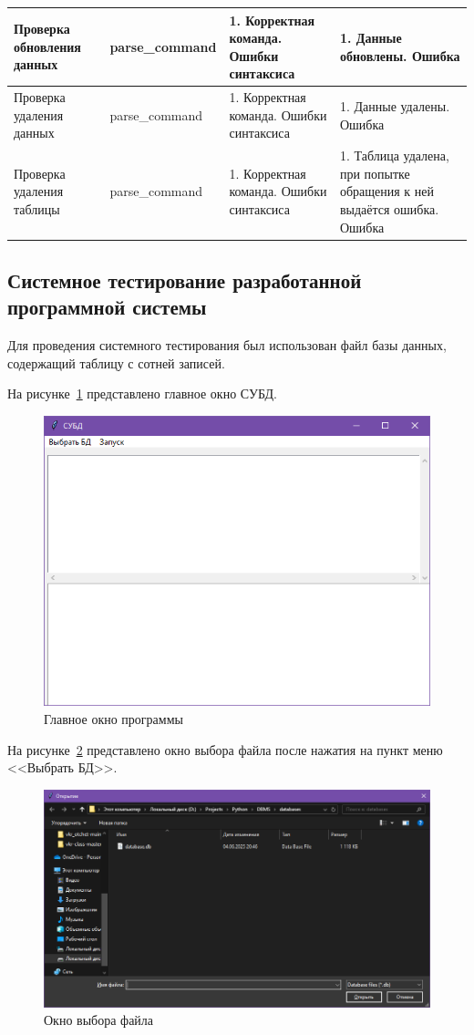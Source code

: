 \begin{xltabular}{\textwidth}{|X|X|X|X|}
	Проверка обновления данных & parse\_command & 1. Корректная команда. Ошибки синтаксиса & 1. Данные обновлены. Ошибка\\ \hline
	Проверка удаления данных & parse\_command & 1. Корректная команда. Ошибки синтаксиса & 1. Данные удалены. Ошибка\\ \hline
	Проверка удаления таблицы & parse\_command & 1. Корректная команда. Ошибки синтаксиса & 1. Таблица удалена, при попытке обращения к ней выдаётся ошибка. Ошибка\\ \hline
\end{xltabular}
\renewcommand{\arraystretch}{1.0}
\vspace{-\baselineskip}

\subsection{Системное тестирование разработанной программной системы}

Для проведения системного тестирования был использован файл базы данных, содержащий таблицу с сотней записей.

На рисунке~\ref{fig:dbms_window} представлено главное окно СУБД.
\begin{figure}[H]
	\centering
	\includegraphics[width=0.7\linewidth]{"images/окно субд"}
	\caption{Главное окно программы}
	\label{fig:dbms_window}
\end{figure}

На рисунке~\ref{fig:select} представлено окно выбора файла после нажатия на пункт меню <<Выбрать БД>>.
\begin{figure}[H]
	\centering
	\includegraphics[width=0.7\linewidth]{"images/выбор файла"}
	\caption{Окно выбора файла}
	\label{fig:select}
\end{figure}

